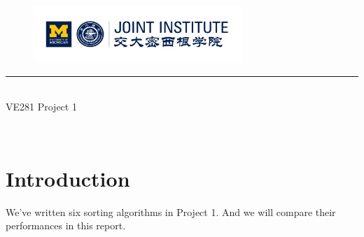 \documentclass{article}
\begin{document}
\renewcommand\arraystretch{1.5}


\thispagestyle{empty}

\begin{center}
\begin{large}
\begin{figure}[!htbp]
\centering
\includegraphics[width=0.7\textwidth]{Logo2.png}
\end{figure}
\hrule
\vspace*{0.25cm}
 \\ 
VE281 Project 1\\
\end{large}
\hrulefill

\vspace*{5cm}

\begin{Large}
 \\
\end{Large}
\vspace*{2em}
\begin{large}
\end{large}
\end{center}
\newpage
\setmainfont{Optima}
\setcounter{page}{1}
\section{Introduction}
\par We've written six sorting algorithms in Project 1. And we will compare their performances in this report.
\end{document}

